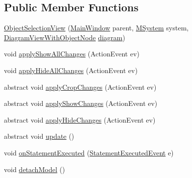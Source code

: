 \subsection*{Public Member Functions}
\begin{DoxyCompactItemize}
\item 
\hyperlink{classorg_1_1tzi_1_1use_1_1gui_1_1views_1_1selection_1_1_object_selection_view_a14b072cf0f94f6964c096bb58073bcb3}{Object\-Selection\-View} (\hyperlink{classorg_1_1tzi_1_1use_1_1gui_1_1main_1_1_main_window}{Main\-Window} parent, \hyperlink{classorg_1_1tzi_1_1use_1_1uml_1_1sys_1_1_m_system}{M\-System} system, \hyperlink{classorg_1_1tzi_1_1use_1_1gui_1_1views_1_1diagrams_1_1_diagram_view_with_object_node}{Diagram\-View\-With\-Object\-Node} \hyperlink{classorg_1_1tzi_1_1use_1_1gui_1_1views_1_1selection_1_1_object_selection_view_a3aab89dd6fcf330a0095e90ac047f196}{diagram})
\item 
void \hyperlink{classorg_1_1tzi_1_1use_1_1gui_1_1views_1_1selection_1_1_object_selection_view_a755e93e6aca5772ea0fb233f30093772}{apply\-Show\-All\-Changes} (Action\-Event ev)
\item 
void \hyperlink{classorg_1_1tzi_1_1use_1_1gui_1_1views_1_1selection_1_1_object_selection_view_acb5ea2ce076f7133e14420c3db91397a}{apply\-Hide\-All\-Changes} (Action\-Event ev)
\item 
abstract void \hyperlink{classorg_1_1tzi_1_1use_1_1gui_1_1views_1_1selection_1_1_object_selection_view_a9753ecc8698f406712a15071b81eb752}{apply\-Crop\-Changes} (Action\-Event ev)
\item 
abstract void \hyperlink{classorg_1_1tzi_1_1use_1_1gui_1_1views_1_1selection_1_1_object_selection_view_a2ef058a67882af698f9460a70836af30}{apply\-Show\-Changes} (Action\-Event ev)
\item 
abstract void \hyperlink{classorg_1_1tzi_1_1use_1_1gui_1_1views_1_1selection_1_1_object_selection_view_a8c6649053fad8c6cf115711c95809b1f}{apply\-Hide\-Changes} (Action\-Event ev)
\item 
abstract void \hyperlink{classorg_1_1tzi_1_1use_1_1gui_1_1views_1_1selection_1_1_object_selection_view_a54a3766a4daa8d12f7b7a7827930542d}{update} ()
\item 
void \hyperlink{classorg_1_1tzi_1_1use_1_1gui_1_1views_1_1selection_1_1_object_selection_view_a4d3f16b9d508653eee8cc681f6c7014c}{on\-Statement\-Executed} (\hyperlink{classorg_1_1tzi_1_1use_1_1uml_1_1sys_1_1events_1_1_statement_executed_event}{Statement\-Executed\-Event} e)
\item 
void \hyperlink{classorg_1_1tzi_1_1use_1_1gui_1_1views_1_1selection_1_1_object_selection_view_aefc034d3c478780fe2ab670dc12b8b0b}{detach\-Model} ()
\end{DoxyCompactItemize}
